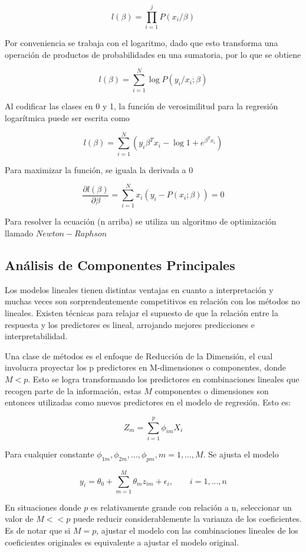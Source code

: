 \documentclass[a4paper,12pt]{Latex/Classes/PhDthesisPSnPDF}
\begin{document}
$$ l(\beta) = \prod_{i=1}^{j}{P(x_{i} / \beta)} $$
  
Por conveniencia se  trabaja con el logaritmo, dado que esto transforma una operación de productos de probabilidades en una sumatoria, por lo que se obtiene

$$ l(\beta) = \sum_{i=1}^{N} \log{P(y_{i}/ x_{i}; \beta)} $$

Al codificar las clases en 0 y 1, la función de verosimilitud para la regresión logarítmica puede ser escrita como

$$ l(\beta) = \sum_{i=1}^{N}(y_{i}\beta^{T}x_{i} - \log{1 + e^{\beta^{T}x_{i}}}) $$

Para maximizar la función, se iguala la derivada a 0

$$ \frac{\partial l(\beta)}{\partial \beta} = \sum_{i=1}^{N}x_{i}(y_{i} - P(x_{i}; \beta)) = 0 $$

Para resolver la ecuación (n arriba) se utiliza un algoritmo de optimización llamado $Newton-Raphson$

\subsection{Análisis de Componentes Principales}

Los modelos lineales tienen distintas ventajas en cuanto a interpretación y muchas veces son sorprendentemente competitivos en relación con los métodos no lineales. Existen técnicas para relajar el supuesto de  que la relación entre la respuesta y los predictores es lineal, arrojando mejores predicciones e interpretabilidad. 

Una clase de métodos es el enfoque de Reducción de la Dimensión, el cual involucra proyectar los p predictores en M-dimensiones o componentes, donde $M < p$. Esto se logra transformando los predictores en combinaciones lineales que recogen parte de la información, estas $M$ componentes o dimensiones son entonces utilizadas como nuevos predictores en el modelo de regresión. Esto es:

$$ Z_{m} = \sum_{i = 1}^{p} \phi_{im}X_{i} $$

Para cualquier constante $ \phi_{1m}, \phi_{2m}, ..., \phi_{pm}, m = 1, ..., M $. Se ajusta el modelo

$$ y_{i} = \theta_{0} + \sum_{m = 1}^{M} \theta_{m}z_{im} + \epsilon_{i},  \qquad i = 1, ..., n $$

En situaciones donde $p$ es relativamente grande con relación a n, seleccionar un valor de $M << p$ puede reducir considerablemente la varianza de los coeficientes. Es de notar que si $M = p$, ajustar el modelo con las combinaciones lineales de los coeficientes originales es equivalente a ajustar el modelo original.
\end{document}
